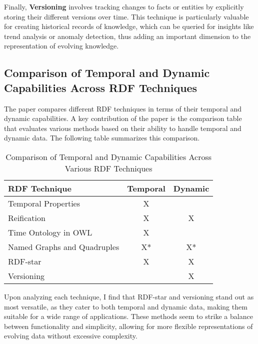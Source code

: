 Finally, \textbf{Versioning} involves tracking changes to facts or entities by explicitly storing their different versions over time. This technique is particularly valuable for 
creating historical records of knowledge, which can be queried for insights like trend analysis or anomaly detection, thus adding an important dimension to the representation of 
evolving knowledge.

\subsection{Comparison of Temporal and Dynamic Capabilities Across RDF Techniques}

The paper compares different RDF techniques in terms of their temporal and dynamic capabilities. A key contribution of the paper is the comparison table that evaluates various 
methods based on their ability to handle temporal and dynamic data. The following table summarizes this comparison.

\begin{table}[h]
    \centering
    \caption{Comparison of Temporal and Dynamic Capabilities Across Various RDF Techniques}
    \begin{tabular}{|l|c|c|}
        \hline
        \textbf{RDF Technique}           & \textbf{Temporal} & \textbf{Dynamic}  \\ \hline
        Temporal Properties              & X                 &                   \\ \hline
        Reification                      & X                 & X                 \\ \hline
        Time Ontology in OWL             & X                 &                   \\ \hline
        Named Graphs and Quadruples      & X*                & X*                \\ \hline
        RDF-star                         & X                 & X                 \\ \hline
        Versioning                       &                   & X                 \\ \hline
    \end{tabular}
\end{table}

Upon analyzing each technique, I find that RDF-star and versioning stand out as most versatile, as they cater to both temporal and dynamic data, making them suitable for a wide range
of applications. These methods seem to strike a balance between functionality and simplicity, allowing for more flexible representations of evolving data without excessive complexity.

